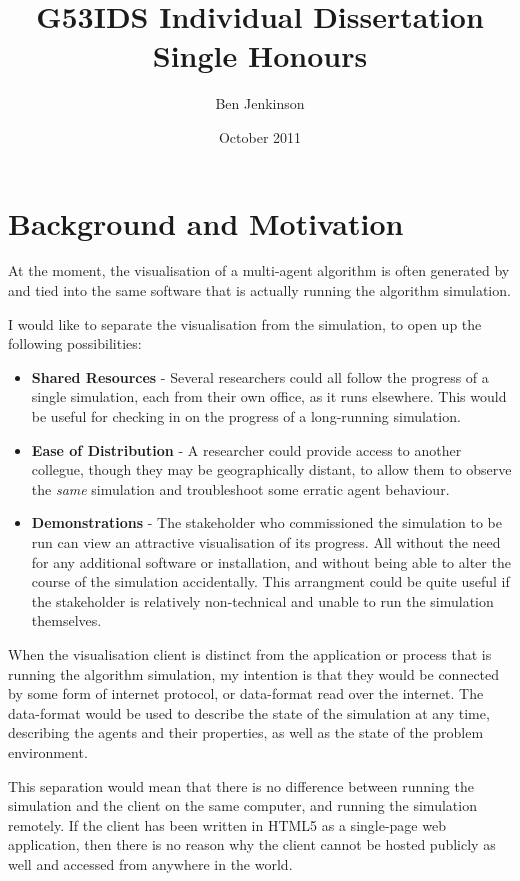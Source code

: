 \documentclass[a4paper]{article}
\title{G53IDS Individual Dissertation Single Honours}
\author{Ben Jenkinson}
\date{October 2011}
\begin{document}
	

	\section{Background and Motivation}

		At the moment, the visualisation of a multi-agent algorithm is often generated by and tied into the same software that is actually running the algorithm simulation.

		I would like to separate the visualisation from the simulation, to open up the following possibilities:

		\begin{itemize}

			\item \textbf{Shared Resources} - Several researchers could all follow the progress of a single simulation, each from their own office, as it runs elsewhere. This would be useful for checking in on the progress of a long-running simulation.

			\item \textbf{Ease of Distribution} - A researcher could provide access to another collegue, though they may be geographically distant, to allow them to observe the \textit{same} simulation and troubleshoot some erratic agent behaviour.

			\item \textbf{Demonstrations} - The stakeholder who commissioned the simulation to be run can view an attractive visualisation of its progress. All without the need for any additional software or installation, and without being able to alter the course of the simulation accidentally. This arrangment could be quite useful if the stakeholder is relatively non-technical and unable to run the simulation themselves.

		\end{itemize}

		When the visualisation client is distinct from the application or process that is running the algorithm simulation, my intention is that they would be connected by some form of internet protocol, or data-format read over the internet. The data-format would be used to describe the state of the simulation at any time, describing the agents and their properties, as well as the state of the problem environment.

		This separation would mean that there is no difference between running the simulation and the client on the same computer, and running the simulation remotely. If the client has been written in HTML5 as a single-page web application, then there is no reason why the client cannot be hosted publicly as well and accessed from anywhere in the world.
\end{document}
